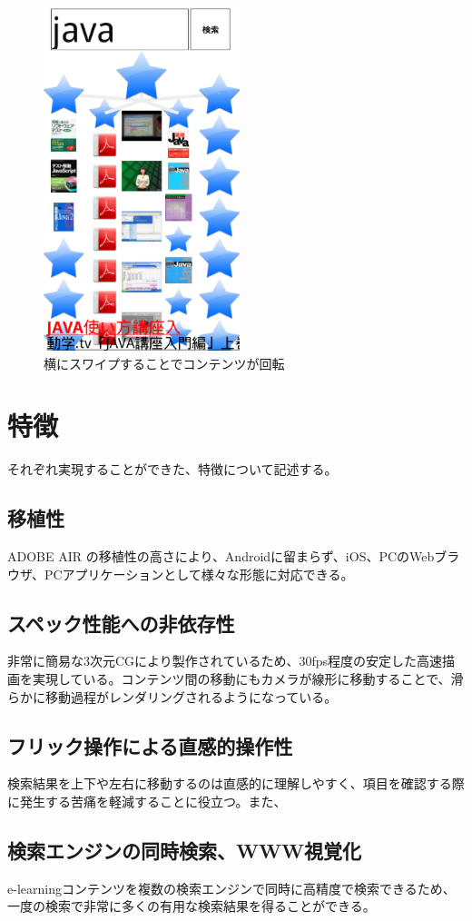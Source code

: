 \begin{figure}[htbp]
\begin{center}
\includegraphics[height=10cm]{eps/le06.eps}
\caption{横にスワイプすることでコンテンツが回転}
\label{le06}
\end{center}
\end{figure}

\section{特徴}
それぞれ実現することができた、特徴について記述する。

\subsection{移植性}
ADOBE AIR の移植性の高さにより、Androidに留まらず、iOS、PCのWebブラウザ、PCアプリケーションとして様々な形態に対応できる。

\subsection{スペック性能への非依存性}
非常に簡易な3次元CGにより製作されているため、30fps程度の安定した高速描画を実現している。コンテンツ間の移動にもカメラが線形に移動することで、滑らかに移動過程がレンダリングされるようになっている。

\subsection{フリック操作による直感的操作性}
検索結果を上下や左右に移動するのは直感的に理解しやすく、項目を確認する際に発生する苦痛を軽減することに役立つ。また、

\subsection{検索エンジンの同時検索、WWW視覚化}
e-learningコンテンツを複数の検索エンジンで同時に高精度で検索できるため、一度の検索で非常に多くの有用な検索結果を得ることができる。